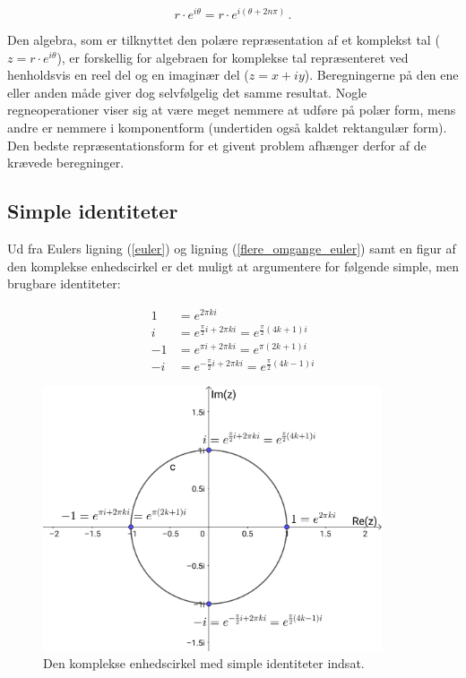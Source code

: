 \documentclass[a4paper, 12pt,titlepage]{article}
\begin{document}
\begin{equation}
\label{flere_omgange_euler}
r \cdot e^{i \theta} = r \cdot e^{i(\theta+2 n \pi)} \,.
\end{equation}

Den algebra, som er tilknyttet den polære repræsentation af et komplekst tal (\(z=r \cdot e^{i\theta}\)), er forskellig for algebraen for komplekse tal repræsenteret ved henholdsvis en reel del og en imaginær del (\(z=x+iy\)). Beregningerne på den ene eller anden måde giver dog selvfølgelig det samme resultat. Nogle regneoperationer viser sig at være meget nemmere at udføre på polær form, mens andre er nemmere i komponentform (undertiden også kaldet rektangulær form). Den bedste repræsentationsform for et givent problem afhænger derfor af de krævede beregninger.

\subsection{Simple identiteter}
\label{sec:orga29aa0c}

Ud fra Eulers ligning (\ref{euler}) og ligning (\ref{flere_omgange_euler}) samt en figur af den komplekse enhedscirkel er det muligt at argumentere for følgende simple, men brugbare identiteter:

\begin{equation}
\label{simple_identiteter}
\begin{aligned}
1 &= e^{2 \pi k i} \\
i &= e^{\frac{\pi}{2}i + 2 \pi k i} = e^{\frac{\pi}{2}\left( 4k +1 \right)i}\\
-1 &= e^{\pi i + 2 \pi k i} = e^{\pi \left( 2k+1 \right)i}\\
-i &= e^{-\frac{\pi}{2}i+2\pi k i} = e^{\frac{\pi}{2}\left( 4k-1 \right)i}
\end{aligned}
\end{equation}

\begin{figure}[htbp]
\centering
\includegraphics[width=10cm]{./img/kompleks_enhedscirkel_identiteter.png}
\caption{\label{fig:simple_identiteter}Den komplekse enhedscirkel med simple identiteter indsat.}
\end{figure}
\end{document}
